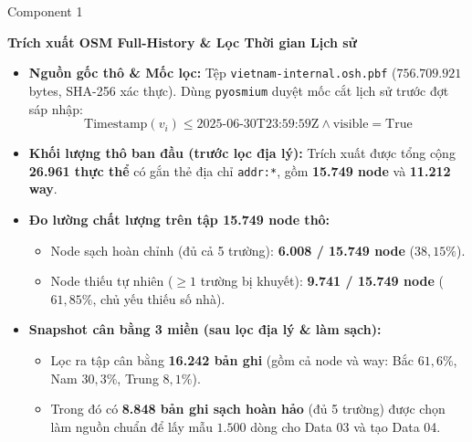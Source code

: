 \documentclass[aspectratio=169,9pt]{beamer}
\begin{document}
\begin{frame}{Component 1}
  \vspace{0.05cm}
  \centerline{\large\textbf{Trích xuất OSM Full-History \& Lọc Thời gian Lịch sử}}
  \vspace{0.2cm}

  \begin{itemize}
    \setlength{\itemsep}{3pt}
    \item \textbf{Nguồn gốc thô \& Mốc lọc:} Tệp \texttt{vietnam-internal.osh.pbf} ($756.709.921$ bytes, SHA-256 xác thực). Dùng \texttt{pyosmium} duyệt mốc cắt lịch sử trước đợt sáp nhập:
      $$\text{Timestamp}(v_i) \le \text{2025-06-30T23:59:59Z} \land \text{visible}=\text{True}$$
    \item \textbf{Khối lượng thô ban đầu (trước lọc địa lý):} Trích xuất được tổng cộng \textbf{26.961 thực thể} có gắn thẻ địa chỉ \texttt{addr:*}, gồm \textbf{15.749 node} và \textbf{11.212 way}.
    \item \textbf{Đo lường chất lượng trên tập 15.749 node thô:}
      \begin{itemize}
        \setlength{\itemsep}{1.5pt}
        \item Node sạch hoàn chỉnh (đủ cả 5 trường): \textbf{6.008 / 15.749 node} ($38{,}15\%$).
        \item Node thiếu tự nhiên ($\ge 1$ trường bị khuyết): \textbf{9.741 / 15.749 node} ($61{,}85\%$, chủ yếu thiếu số nhà).
      \end{itemize}
    \item \textbf{Snapshot cân bằng 3 miền (sau lọc địa lý \& làm sạch):}
      \begin{itemize}
        \setlength{\itemsep}{1.5pt}
        \item Lọc ra tập cân bằng \textbf{16.242 bản ghi} (gồm cả node và way: Bắc $61{,}6\%$, Nam $30{,}3\%$, Trung $8{,}1\%$).
        \item Trong đó có \textbf{8.848 bản ghi sạch hoàn hảo} (đủ 5 trường) được chọn làm nguồn chuẩn để lấy mẫu $1.500$ dòng cho Data 03 và tạo Data 04.
      \end{itemize}
  \end{itemize}
\end{frame}
\end{document}
